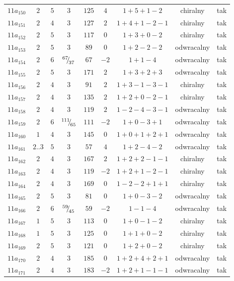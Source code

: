 \begin{longtable}{ccccccccc}
$11a_{150}$ & $2$ & $5$ & $3$ & $125$ & $4$ & $1+5+1-2$ & chiralny & tak \\
$11a_{151}$ & $2$ & $4$ & $3$ & $127$ & $2$ & $1+4+1-2-1$ & chiralny & tak \\
$11a_{152}$ & $2$ & $5$ & $3$ & $117$ & $0$ & $1+3+0-2$ & chiralny & tak \\
$11a_{153}$ & $2$ & $5$ & $3$ & $89$ & $0$ & $1+2-2-2$ & odwracalny & tak \\
$11a_{154}$ & $2$ & $6$ & ${}^{67}{\mskip -5mu/\mskip -3mu}_{37}$ & $67$ & $-2$ & $1+1-4$ & odwracalny & tak \\
$11a_{155}$ & $2$ & $5$ & $3$ & $171$ & $2$ & $1+3+2+3$ & odwracalny & tak \\
$11a_{156}$ & $2$ & $4$ & $3$ & $91$ & $2$ & $1+3-1-3-1$ & chiralny & tak \\
$11a_{157}$ & $2$ & $4$ & $3$ & $135$ & $2$ & $1+2+0-2-1$ & chiralny & tak \\
$11a_{158}$ & $2$ & $4$ & $3$ & $119$ & $2$ & $1-2-4-3-1$ & odwracalny & tak \\
$11a_{159}$ & $2$ & $6$ & ${}^{111}{\mskip -5mu/\mskip -3mu}_{65}$ & $111$ & $-2$ & $1+0-3+1$ & odwracalny & tak \\
$11a_{160}$ & $1$ & $4$ & $3$ & $145$ & $0$ & $1+0+1+2+1$ & odwracalny & tak \\
$11a_{161}$ & $2..3$ & $5$ & $3$ & $57$ & $4$ & $1+2-4-2$ & odwracalny & tak \\
$11a_{162}$ & $2$ & $4$ & $3$ & $167$ & $2$ & $1+2+2-1-1$ & chiralny & tak \\
$11a_{163}$ & $2$ & $4$ & $3$ & $119$ & $-2$ & $1+2+1-2-1$ & chiralny & tak \\
$11a_{164}$ & $2$ & $4$ & $3$ & $169$ & $0$ & $1-2-2+1+1$ & chiralny & tak \\
$11a_{165}$ & $2$ & $5$ & $3$ & $81$ & $0$ & $1+0-3-2$ & odwracalny & tak \\
$11a_{166}$ & $2$ & $6$ & ${}^{59}{\mskip -5mu/\mskip -3mu}_{45}$ & $59$ & $-2$ & $1-1-4$ & odwracalny & tak \\
$11a_{167}$ & $1$ & $5$ & $3$ & $113$ & $0$ & $1+0-1-2$ & chiralny & tak \\
$11a_{168}$ & $1$ & $5$ & $3$ & $125$ & $0$ & $1+1+0-2$ & chiralny & tak \\
$11a_{169}$ & $2$ & $5$ & $3$ & $121$ & $0$ & $1+2+0-2$ & chiralny & tak \\
$11a_{170}$ & $2$ & $4$ & $3$ & $185$ & $0$ & $1+2+4+2+1$ & odwracalny & tak \\
$11a_{171}$ & $2$ & $4$ & $3$ & $183$ & $-2$ & $1+2+1-1-1$ & odwracalny & tak \\

\end{longtable}
